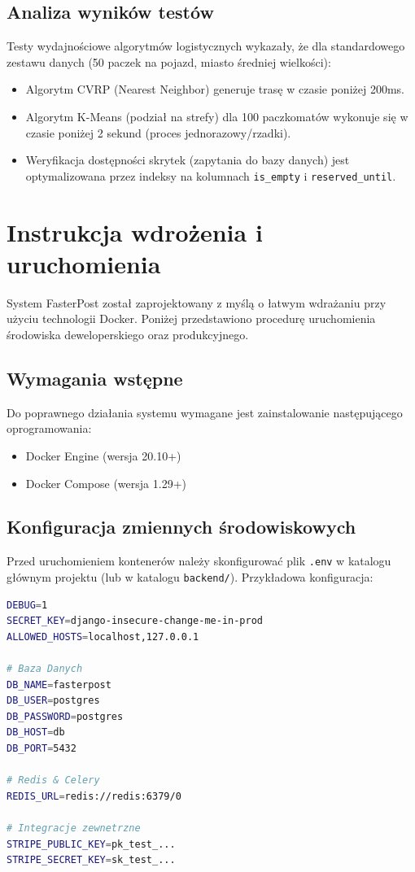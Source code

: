 \subsection{Analiza wyników testów}

Testy wydajnościowe algorytmów logistycznych wykazały, że dla standardowego zestawu danych (50 paczek na pojazd, miasto średniej wielkości):
\begin{itemize}
    \item Algorytm CVRP (Nearest Neighbor) generuje trasę w czasie poniżej 200ms.
    \item Algorytm K-Means (podział na strefy) dla 100 paczkomatów wykonuje się w czasie poniżej 2 sekund (proces jednorazowy/rzadki).
    \item Weryfikacja dostępności skrytek (zapytania do bazy danych) jest optymalizowana przez indeksy na kolumnach \texttt{is\_empty} i \texttt{reserved\_until}.
\end{itemize}

\section{Instrukcja wdrożenia i uruchomienia}

System FasterPost został zaprojektowany z myślą o łatwym wdrażaniu przy użyciu technologii Docker. Poniżej przedstawiono procedurę uruchomienia środowiska deweloperskiego oraz produkcyjnego.

\subsection{Wymagania wstępne}

Do poprawnego działania systemu wymagane jest zainstalowanie następującego oprogramowania:
\begin{itemize}
    \item Docker Engine (wersja 20.10+)
    \item Docker Compose (wersja 1.29+)
\end{itemize}

\subsection{Konfiguracja zmiennych środowiskowych}

Przed uruchomieniem kontenerów należy skonfigurować plik \texttt{.env} w katalogu głównym projektu (lub w katalogu \texttt{backend/}). Przykładowa konfiguracja:

\begin{lstlisting}[language=bash, caption=Przykładowa konfiguracja pliku .env]
DEBUG=1
SECRET_KEY=django-insecure-change-me-in-prod
ALLOWED_HOSTS=localhost,127.0.0.1

# Baza Danych
DB_NAME=fasterpost
DB_USER=postgres
DB_PASSWORD=postgres
DB_HOST=db
DB_PORT=5432

# Redis & Celery
REDIS_URL=redis://redis:6379/0

# Integracje zewnetrzne
STRIPE_PUBLIC_KEY=pk_test_...
STRIPE_SECRET_KEY=sk_test_...
\end{lstlisting}


